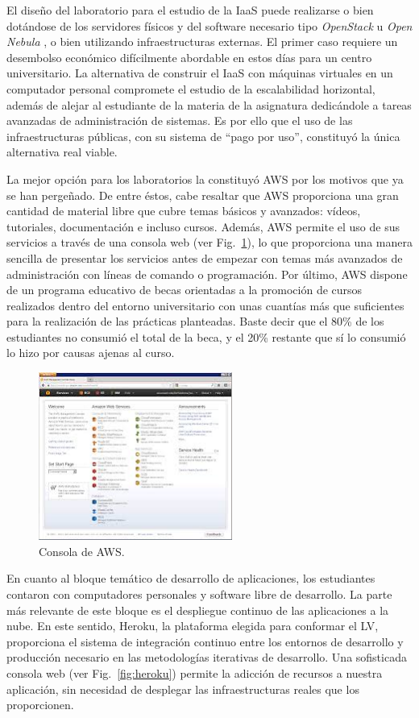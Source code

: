 \documentclass[conference]{IEEEtran}
\begin{document}
El diseño del laboratorio para el estudio de la IaaS  puede realizarse
o bien dotándose de los servidores físicos y del software necesario tipo \textit{OpenStack} \cite{Pepple:2011} u \textit{Open Nebula} \cite{OpenNebula:2014},
o bien utilizando infraestructuras externas.
El primer caso requiere un desembolso económico difícilmente abordable en estos días para un centro universitario.
La alternativa de construir el IaaS con máquinas virtuales en un computador personal compromete el estudio de la 
escalabilidad horizontal, además de  alejar al estudiante de la materia de la asignatura dedicándole a tareas 
avanzadas de administración de sistemas. Es por ello que el uso de las infraestructuras públicas, con su sistema 
de ``pago por uso'', constituyó la única alternativa real viable.

La mejor opción para los laboratorios la constituyó AWS por los motivos que ya se han pergeñado. De entre éstos, cabe resaltar que
AWS proporciona una gran cantidad de material libre que cubre temas básicos y avanzados: vídeos, tutoriales, documentación e incluso cursos.
Además, AWS permite el uso de sus servicios a través de una consola web (ver Fig.~\ref{fig:console}), lo que proporciona una  manera sencilla de presentar
los servicios antes de empezar con temas más avanzados de administración con líneas de comando o programación.
Por último, AWS dispone de un programa educativo de becas orientadas a la promoción de cursos realizados dentro del entorno universitario con unas cuantías más que suficientes
para la realización de las prácticas planteadas. Baste decir que el 80\% de los estudiantes no consumió el total de la beca, y el 20\% restante que sí lo consumió lo hizo por causas ajenas al curso.

\begin{figure}[!t]
\centering
\includegraphics[width=2.5in]{console.jpeg}
\caption{Consola de AWS.}
\label{fig:console}
\end{figure} 

En cuanto al bloque temático de desarrollo de aplicaciones, los estudiantes contaron con computadores personales y software libre de desarrollo.
La parte más relevante de este bloque es el despliegue continuo de las aplicaciones a la nube. En este sentido, Heroku, la plataforma elegida para conformar el LV, proporciona
el sistema de integración continuo entre los entornos de desarrollo y producción necesario en las metodologías iterativas de desarrollo.
Una sofisticada consola web (ver Fig.~\ref{fig:heroku}) permite la adicción de recursos a nuestra aplicación,
sin necesidad de desplegar las infraestructuras reales que los proporcionen.
\end{document}
